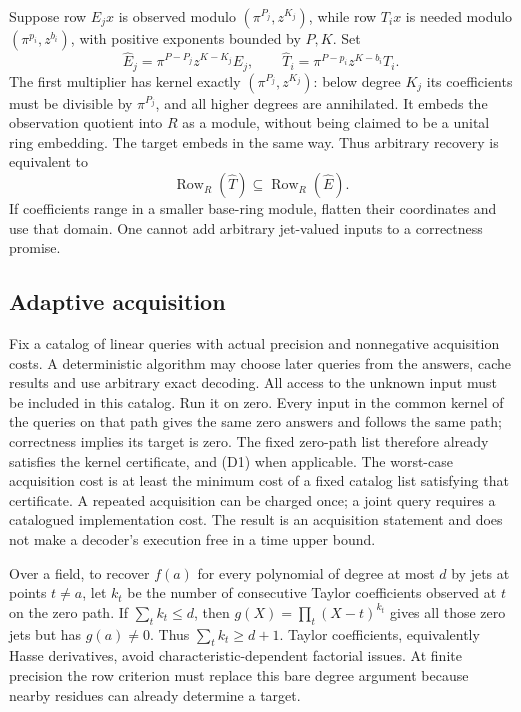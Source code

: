 \documentclass[11pt,a4paper]{article}
\begin{document}
Suppose row \(E_jx\) is observed modulo \((\pi^{P_j},z^{K_j})\), while
row \(T_ix\) is needed modulo \((\pi^{p_i},z^{b_i})\), with positive
exponents bounded by \(P,K\). Set \[
 \widehat E_j=\pi^{P-P_j}z^{K-K_j}E_j,\qquad
 \widehat T_i=\pi^{P-p_i}z^{K-b_i}T_i.
\] The first multiplier has kernel exactly \((\pi^{P_j},z^{K_j})\):
below degree \(K_j\) its coefficients must be divisible by
\(\pi^{P_j}\), and all higher degrees are annihilated. It embeds the
observation quotient into \(R\) as a module, without being claimed to be
a unital ring embedding. The target embeds in the same way. Thus
arbitrary recovery is equivalent to \[
 \operatorname{Row}_R(\widehat T)
       \subseteq\operatorname{Row}_R(\widehat E). \tag{D1}
\] If coefficients range in a smaller base-ring module, flatten their
coordinates and use that domain. One cannot add arbitrary jet-valued
inputs to a correctness promise.

\subsection{Adaptive acquisition}\label{v8-adaptive-acquisition}

Fix a catalog of linear queries with actual precision and nonnegative
acquisition costs. A deterministic algorithm may choose later queries
from the answers, cache results and use arbitrary exact decoding. All
access to the unknown input must be included in this catalog. Run it on
zero. Every input in the common kernel of the queries on that path gives
the same zero answers and follows the same path; correctness implies its
target is zero. The fixed zero-path list therefore already satisfies the
kernel certificate, and (D1) when applicable. The worst-case acquisition
cost is at least the minimum cost of a fixed catalog list satisfying
that certificate. A repeated acquisition can be charged once; a joint
query requires a catalogued implementation cost. The result is an
acquisition statement and does not make a decoder's execution free in a
time upper bound.

Over a field, to recover \(f(a)\) for every polynomial of degree at most
\(d\) by jets at points \(t\ne a\), let \(k_t\) be the number of
consecutive Taylor coefficients observed at \(t\) on the zero path. If
\(\sum_t k_t\le d\), then \(g(X)=\prod_t(X-t)^{k_t}\) gives all those
zero jets but has \(g(a)\ne0\). Thus \(\sum_t k_t\ge d+1\). Taylor
coefficients, equivalently Hasse derivatives, avoid
characteristic-dependent factorial issues. At finite precision the row
criterion must replace this bare degree argument because nearby residues
can already determine a target.
\end{document}
